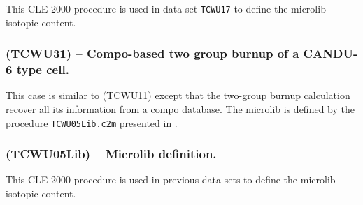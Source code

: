 This CLE-2000 procedure is used in data-set {\tt TCWU17} to define the {\sc microlib} isotopic content.


\subsubsection{\tst(TCWU31) -- Compo-based two group burnup of a CANDU-6 type cell.}

This case is similar to \tst(TCWU11) except that the two-group burnup calculation
recover all its information from a {\sc compo} database.
The {\sc microlib} is defined by the procedure {\tt TCWU05Lib.c2m} presented in .


\subsubsection{\tst(TCWU05Lib) -- Microlib definition.}\label{sect:TCWU05Lib}

This CLE-2000 procedure is used in previous data-sets to define the {\sc microlib} isotopic content.

\eject
